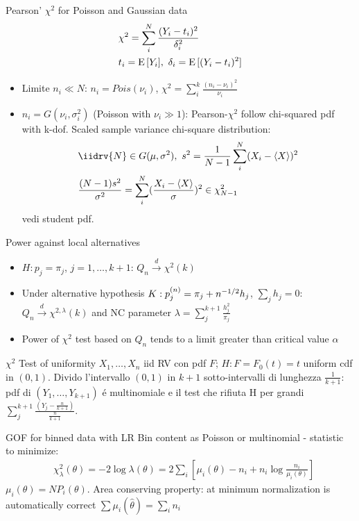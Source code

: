 \documentclass[asd-beamer.tex]{subfiles}
\begin{document}
\begin{frame}{Pearson' $\chi^2$ for Poisson and Gaussian data}
\begin{align*}
&\chi^2=\sum_i^N\frac{(Y_i-t_i)^2}{\delta_i^2}\\
&t_i=\operatorname{E}{[Y_i]},\ \delta_i=\operatorname{E}{[(Y_i-t_i)^2]}
\end{align*}
\begin{itemize}
\item Limite $n_i\ll N$: $n_i=Pois(\nu_i)$, $\chi^2=\sum_i^k\frac{(n_i-\nu_i)^2}{\nu_i}$
\item $n_i=G(\nu_i,\sigma_i^2)$ (Poisson with $\nu_i\gg1$): Pearson-$\chi^2$ follow chi-squared pdf with k-dof.
Scaled sample variance chi-square distribution:
\begin{align*}
&\iidrv{N}\in G(\mu,\sigma^2),\ s^2=\frac{1}{N-1}\sum_i^N(X_i-\exv{X})^2\\
&\frac{(N-1)s^2}{\sigma^2}=\sum_i^N(\frac{X_i-\exv{X}}{\sigma})^2\in\chi^2_{N-1}
\end{align*}
vedi student pdf.
\end{itemize}
\end{frame}

\begin{frame}{Power against local alternatives}
	\begin{itemize}
		\item $H: p_j=\pi_j$, $j=1,\ldots,k+1$: $Q_n\xrightarrow{d}\chi^2(k)$
		\item Under alternative hypothesis $K: p_j^{(n)}=\pi_j+n^{-1/2}h_j$, $\sum_jh_j=0$: $Q_n\xrightarrow{d}\chi^{2,\lambda}(k)$ and NC parameter $\lambda=\sum_j^{k+1}\frac{h_j^2}{\pi_j}$
		\item Power of $\chi^2$ test based on $Q_n$ tends to a limit greater than critical value $\alpha$
	\end{itemize}
\end{frame}

\begin{frame}{$\chi^2$ Test of uniformity}
$X_1,\ldots,X_n$ iid RV con pdf $F$; $H: F=F_0(t)=t$ uniform cdf in $(0,1)$. Divido l'intervallo $(0,1)$ in $k+1$ sotto-intervalli di lunghezza $\frac{1}{k+1}$: pdf di $(Y_1,\ldots,Y_{k+1})$ \'e multinomiale e il test che rifiuta H per grandi $\sum_j^{k+1}\frac{(Y_j-\frac{n}{k+1})}{\frac{n}{k+1}}$.
\end{frame}



\begin{frame}{GOF for binned data with LR}
Bin content as Poisson or multinomial - statistic to minimize:
\begin{align*}
&\chi^2_{\lambda}(\theta)=-2\log{\lambda(\theta)}=2\sum_i[\mu_i(\theta)-n_i+n_i\log{\frac{n_i}{\mu_i(\theta)}}]
\end{align*}
$\mu_i(\theta)=NP_i(\theta)$. Area conserving property: at minimum normalization is automatically correct $\sum\mu_i(\hat{\theta})=\sum_in_i$
\end{frame}
\end{document}
